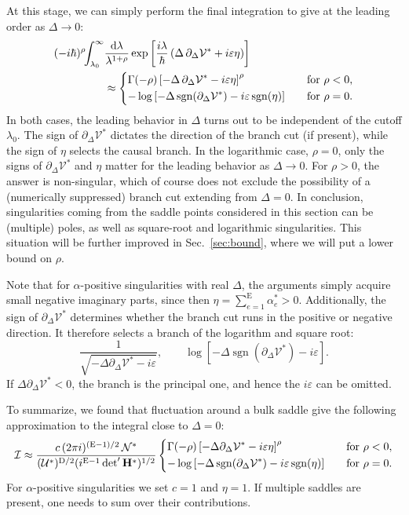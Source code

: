 \documentclass[12pt]{article}
\numberwithin{figure}{section}
\DeclareMathOperator{\sgn}{sgn}
\def \be {\begin{equation}}
\def \ee {\end{equation}}
\def \nn {\nonumber}
\def \D {\mathrm{D}}
\def \E {\mathrm{E}}
\def \U {\mathcal{U}}
\def \d {\mathrm{d}}
\def \eps {\varepsilon}
\def \V {\mathcal{V}}
\def \I {\mathcal{I}}
\def \N {\mathcal{N}}
\def \upgamma {\rho}
\begin{document}
	At this stage, we can simply perform the final integration to give at the leading order as $\Delta \to 0$:
		\begin{align}
		(-i\hbar)^{\upgamma} \!\!\int_{\lambda_0}^\infty& \frac{\d\lambda}{\lambda^{1+\upgamma}} \exp \left[ \frac{i\lambda}{\hbar} \left(\Delta \, \partial_\Delta \V^\ast + i\eps\eta\right) \right]\nn\\ &\approx \begin{dcases}
			\Gamma(-\upgamma) \left[-\Delta \, \partial_\Delta \V^\ast - i\eps\eta\right]^\upgamma
			&\text{for } \upgamma < 0,\\
			- \log \left[-\Delta \sgn(\partial_\Delta \V^\ast) - i\eps \sgn(\eta)\right]
			\quad &\text{for } \upgamma = 0.
		\end{dcases}
		\end{align}
		In both cases, the leading behavior in $\Delta$ turns out to be independent of the cutoff $\lambda_0$. The sign of $\partial_\Delta \V^\ast$ dictates the direction of the branch cut (if present), while the sign of $\eta$ selects the causal branch. In the logarithmic case, $\rho=0$, only the signs of $\partial_\Delta \V^\ast$ and $\eta$ matter for the leading behavior as $\Delta \to 0$. For $\upgamma > 0$, the answer is non-singular, which of course does not exclude the possibility of a (numerically suppressed) branch cut extending from $\Delta=0$. In conclusion, singularities coming from the saddle points considered in this section can be (multiple) poles, as well as square-root and logarithmic singularities. This situation will be further improved in Sec.~\ref{sec:bound}, where we will put a lower bound on $\upgamma$.
		
		Note that for $\alpha$-positive singularities with real $\Delta$, the arguments simply acquire small negative imaginary parts, since then $\eta = \sum_{e=1}^{\E}\alpha_e^\ast > 0$. Additionally, the sign of $\partial_{\Delta}\V^\ast$ determines whether the branch cut runs in the positive or negative direction. It therefore selects a branch of the logarithm and square root:
		\be
		\frac{1}{\sqrt{-\Delta \partial_{\Delta}\V^\ast - i\eps}}, \qquad \log\left[ - \Delta \sgn(\partial_{\Delta}\V^\ast) - i\eps\right].
		\ee
		If $\Delta \partial_\Delta \V^\ast < 0$, the branch is the principal one, and hence the $i\eps$ can be omitted.
		
		To summarize, we found that fluctuation around a bulk saddle give the following approximation to the integral close to $\Delta=0$:
		\be\label{eq:expansion}
		\I \approx \frac{c\,(2\pi i)^{(\E-1)/2}\, \N^\ast}{(\U^\ast)^{\D/2} (i^{\E-1} \det' \mathbf{H}^\ast)^{1/2}} \begin{dcases}
			\Gamma(-\upgamma) \left[-\Delta\partial_\Delta \V^\ast - i\eps \eta \right]^\upgamma
			&\text{for } \upgamma < 0,\\
			- \log \left[-\Delta \sgn(\partial_\Delta \V^\ast) - i\eps \sgn(\eta) \right]
			\quad &\text{for } \upgamma = 0.
		\end{dcases}
		\ee
		For $\alpha$-positive singularities we set $c=1$ and $\eta=1$. 
		If multiple saddles are present, one needs to sum over their contributions.
		
\end{document}
